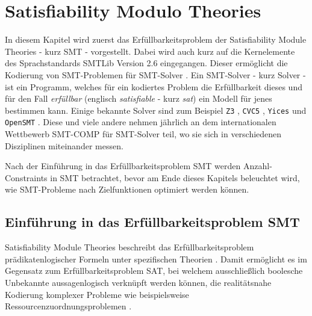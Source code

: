 \chapter{Satisfiability Modulo Theories}
\label{chapter:smt}

In diesem Kapitel wird zuerst das Erfüllbarkeitsproblem der Satisfiability Module Theories - kurz SMT - vorgestellt.
Dabei wird auch kurz auf die Kernelemente des Sprachstandards SMTLib Version 2.6 \cite{smtlib} eingegangen.
Dieser ermöglicht die Kodierung von SMT-Problemen für SMT-Solver \cite{smt}.
Ein \gls{SMT-Solver} - kurz Solver - ist ein Programm, welches für ein kodiertes Problem die Erfüllbarkeit dieses und für den
Fall \textit{erfüllbar} (englisch \textit{satisfiable} - kurz \textit{sat}) ein Modell für jenes bestimmen kann.
Einige bekannte Solver sind zum Beispiel \texttt{Z3} \cite{z3}, \texttt{CVC5} \cite{cvc5}, \texttt{Yices} \cite{yices} und \texttt{OpenSMT} \cite{opensmt}.
Diese und viele andere nehmen jährlich an dem internationalen Wettbewerb \gls{SMT-COMP} \cite{smtcomp} für SMT-Solver teil,
wo sie sich in verschiedenen Disziplinen miteinander messen.

Nach der Einführung in das Erfüllbarkeitsproblem SMT werden Anzahl-Constraints in SMT betrachtet,
bevor am Ende dieses Kapitels beleuchtet wird, wie SMT-Probleme nach Zielfunktionen optimiert werden können.

\section{Einführung in das Erfüllbarkeitsproblem SMT}
\label{sec:smtbasics}
Satisfiability Module Theories beschreibt das Erfüllbarkeitsproblem prädikatenlogischer Formeln unter spezifischen Theorien \cite{smt}.
Damit ermöglicht es im Gegensatz zum Erfüllbarkeitsproblem \gls{SAT}, bei welchem ausschließlich boolesche Unbekannte aussagenlogisch verknüpft werden können,
die realitätsnahe Kodierung komplexer Probleme wie beispielsweise Ressourcenzuordnungsproblemen \cite{rcpsp}.

